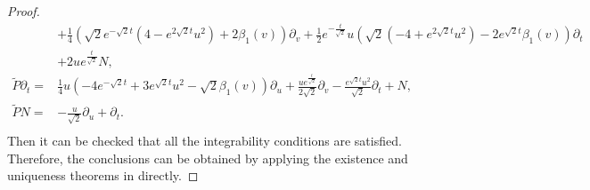 \documentclass[reqno]{amsart}%
\theoremstyle{definition}
\numberwithin{equation}{section}
\begin{document}
\begin{proof}
\begin{equation}
\begin{aligned}
&+\tfrac{1}{4}(\sqrt{2}e^{-\sqrt{2}t}(4-e^{2\sqrt{2}t}u^2)+2\beta_1(v))\partial_v
+\tfrac{1}{2}e^{-\tfrac{t}{\sqrt{2}}}u(\sqrt{2}(-4+e^{2\sqrt{2}t}u^2)-2e^{\sqrt{2}t} \beta_1(v))\partial_t\\
&+2ue^{\tfrac{t}{\sqrt{2}}}N,\\
\tilde{P}\partial_t=&\tfrac{1}{4}u(-4e^{-\sqrt{2}t}+3e^{\sqrt{2}t}u^2-\sqrt{2} \beta_1(v))\partial_u+\tfrac{ue^{\frac{t}{\sqrt{2}}}}{2\sqrt{2}}\partial_v
-\tfrac{e^{\sqrt{2}t}u^2}{\sqrt{2}}\partial_t+N,\\
\tilde{P}N=&-\tfrac{u}{\sqrt{2}}\partial_u+\partial_t.\\	
\end{aligned}
\end{equation}
Then it can be  checked  that all the integrability conditions are satisfied.
Therefore, the conclusions can be obtained by applying  the existence and uniqueness theorems in  \cite{K,L-T-V} directly.
\end{proof}
\end{document}
